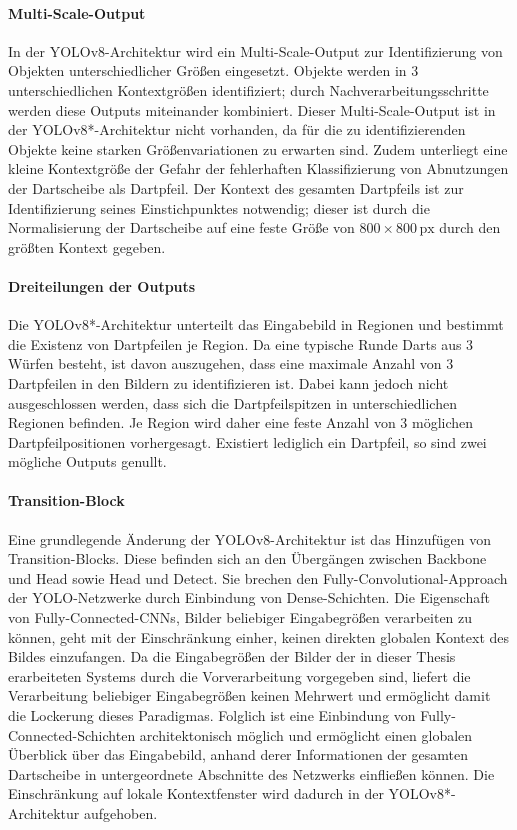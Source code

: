 \paragraph{Multi-Scale-Output}

In der YOLOv8-Architektur wird ein Multi-Scale-Output zur Identifizierung von Objekten unterschiedlicher Größen eingesetzt. Objekte werden in 3 unterschiedlichen Kontextgrößen identifiziert; durch Nachverarbeitungsschritte werden diese Outputs miteinander kombiniert. Dieser Multi-Scale-Output ist in der YOLOv8*-Architektur nicht vorhanden, da für die zu identifizierenden Objekte keine starken Größenvariationen zu erwarten sind. Zudem unterliegt eine kleine Kontextgröße der Gefahr der fehlerhaften Klassifizierung von Abnutzungen der Dartscheibe als Dartpfeil. Der Kontext des gesamten Dartpfeils ist zur Identifizierung seines Einstichpunktes notwendig; dieser ist durch die Normalisierung der Dartscheibe auf eine feste Größe von $800 \times 800\,\text{px}$ durch den größten Kontext gegeben.

\paragraph{Dreiteilungen der Outputs}

Die YOLOv8*-Architektur unterteilt das Eingabebild in Regionen und bestimmt die Existenz von Dartpfeilen je Region. Da eine typische Runde Darts aus 3 Würfen besteht, ist davon auszugehen, dass eine maximale Anzahl von 3 Dartpfeilen in den Bildern zu identifizieren ist. Dabei kann jedoch nicht ausgeschlossen werden, dass sich die Dartpfeilspitzen in unterschiedlichen Regionen befinden. Je Region wird daher eine feste Anzahl von 3 möglichen Dartpfeilpositionen vorhergesagt. Existiert lediglich ein Dartpfeil, so sind zwei mögliche Outputs genullt.

\paragraph{Transition-Block}

Eine grundlegende Änderung der YOLOv8-Architektur ist das Hinzufügen von Transition-Blocks. Diese befinden sich an den Übergängen zwischen Backbone und Head sowie Head und Detect. Sie brechen den Fully-Convolutional-Approach der YOLO-Netzwerke durch Einbindung von Dense-Schichten. Die Eigenschaft von Fully-Connected-CNNs, Bilder beliebiger Eingabegrößen verarbeiten zu können, geht mit der Einschränkung einher, keinen direkten globalen Kontext des Bildes einzufangen. Da die Eingabegrößen der Bilder der in dieser Thesis erarbeiteten Systems durch die Vorverarbeitung vorgegeben sind, liefert die Verarbeitung beliebiger Eingabegrößen keinen Mehrwert und ermöglicht damit die Lockerung dieses Paradigmas. Folglich ist eine Einbindung von Fully-Connected-Schichten architektonisch möglich und ermöglicht einen globalen Überblick über das Eingabebild, anhand derer Informationen der gesamten Dartscheibe in untergeordnete Abschnitte des Netzwerks einfließen können. Die Einschränkung auf lokale Kontextfenster wird dadurch in der YOLOv8*-Architektur aufgehoben.

